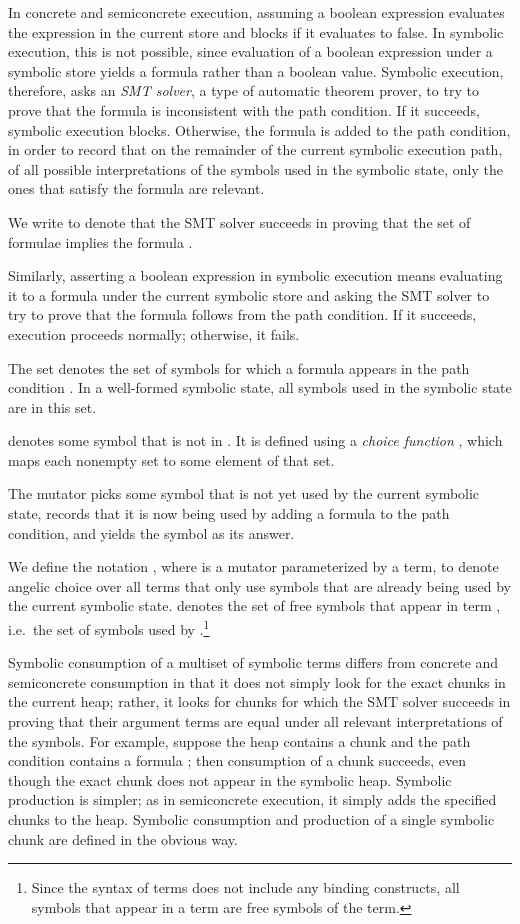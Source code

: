 \documentclass{CSML}
\theoremstyle{definition}\newtheorem{notation}[thm]{Notation}
\theoremstyle{plain}\newtheorem{satz}[thm]{Satz}
\begin{document}
In concrete and semiconcrete execution, assuming a boolean expression 
evaluates the expression in the current store and blocks if it evaluates 
to false. In symbolic execution, this is not possible, since evaluation of 
a boolean expression under a symbolic store yields a formula rather than a 
boolean value. Symbolic execution, therefore, asks an \emph{SMT solver}, a 
type of automatic theorem prover, to try to prove that the formula is 
inconsistent with the path condition. If it succeeds, symbolic execution 
blocks. Otherwise, the formula is added to the path condition, in order to 
record that on the remainder of the current symbolic execution path, of 
all possible interpretations of the symbols used in the symbolic state, 
only the ones that satisfy the formula are relevant.

We write  to denote that the SMT solver 
succeeds in proving that the set of formulae  implies the formula 
.

Similarly, asserting a boolean expression in symbolic execution means 
evaluating it to a formula under the current symbolic store and asking the 
SMT solver to try to prove that the formula follows from the path 
condition. If it succeeds, execution proceeds normally; otherwise, it 
fails.

The set  denotes the set of symbols  for 
which a formula  appears in the path condition 
. In a well-formed symbolic state, all symbols used in the symbolic 
state are in this set. 

 denotes some symbol that is not in 
. It is defined using a \emph{choice function} 
, which maps each nonempty set to some element of that set.

The mutator  picks some symbol  that is not yet 
used by the current symbolic state, records that it is now being used by 
adding a formula  to the path condition, and yields 
the symbol as its answer.

We define the notation , where  is a mutator 
parameterized by a term, to denote angelic choice over all terms that only 
use symbols that are already being used by the current symbolic state. 
 denotes the set of free symbols that appear in term , 
i.e.~the set of symbols used by .\footnote{Since the syntax of terms 
does not include any binding constructs, all symbols that appear in a term 
are free symbols of the term.}

Symbolic consumption  of a multiset  of 
symbolic terms differs from concrete and semiconcrete consumption in that 
it does not simply look for the exact chunks  in the current heap; 
rather, it looks for chunks for which the SMT solver succeeds in proving 
that their argument terms are equal under all relevant interpretations of 
the symbols. For example, suppose the heap contains a chunk 
 and the path condition contains a formula ; then consumption of a chunk  succeeds, 
even though the exact chunk  does not appear in the 
symbolic heap. Symbolic production is simpler; as in semiconcrete 
execution, it simply adds the specified chunks to the heap. Symbolic consumption and production of a single symbolic chunk  are defined in the obvious way.
\end{document}
